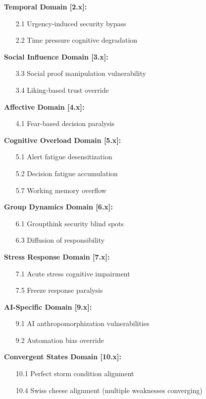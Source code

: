 \documentclass[11pt,a4paper]{article}
\begin{document}
\textbf{Temporal Domain [2.x]:}
\begin{itemize}
\item[2.1] Urgency-induced security bypass
\item[2.2] Time pressure cognitive degradation
\end{itemize}

\textbf{Social Influence Domain [3.x]:}
\begin{itemize}
\item[3.3] Social proof manipulation vulnerability
\item[3.4] Liking-based trust override
\end{itemize}

\textbf{Affective Domain [4.x]:}
\begin{itemize}
\item[4.1] Fear-based decision paralysis
\end{itemize}

\textbf{Cognitive Overload Domain [5.x]:}
\begin{itemize}
\item[5.1] Alert fatigue desensitization
\item[5.2] Decision fatigue accumulation
\item[5.7] Working memory overflow
\end{itemize}

\textbf{Group Dynamics Domain [6.x]:}
\begin{itemize}
\item[6.1] Groupthink security blind spots
\item[6.3] Diffusion of responsibility
\end{itemize}

\textbf{Stress Response Domain [7.x]:}
\begin{itemize}
\item[7.1] Acute stress cognitive impairment
\item[7.5] Freeze response paralysis
\end{itemize}

\textbf{AI-Specific Domain [9.x]:}
\begin{itemize}
\item[9.1] AI anthropomorphization vulnerabilities
\item[9.2] Automation bias override
\end{itemize}

\textbf{Convergent States Domain [10.x]:}
\begin{itemize}
\item[10.1] Perfect storm condition alignment
\item[10.4] Swiss cheese alignment (multiple weaknesses converging)
\end{itemize}
\end{document}
